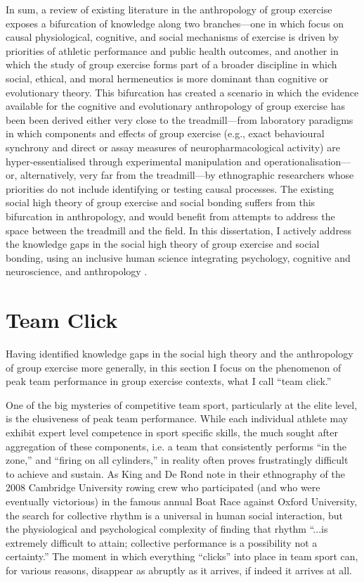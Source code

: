 \begin{CJK}{UTF8}{gbsn}
In sum, a review of existing literature in the anthropology of group exercise exposes a bifurcation of knowledge along two branches---one in which focus on causal physiological, cognitive, and social mechanisms of exercise is driven by priorities of athletic performance and public health outcomes, and another in which the study of group exercise forms part of a broader discipline in which social, ethical, and moral hermeneutics is more dominant than cognitive or evolutionary theory.  This bifurcation has created a scenario in which the evidence available for the cognitive and evolutionary anthropology of group exercise has been been derived either very close to the treadmill---from laboratory paradigms in which components and effects of group exercise (e.g., exact behavioural synchrony and direct or assay measures of neuropharmacological activity) are hyper-essentialised through experimental manipulation and operationalisation---or, alternatively, very far from the treadmill---by ethnographic researchers whose priorities do not include identifying or testing causal processes.  The existing social high theory of group exercise and social bonding suffers from this bifurcation in anthropology, and would benefit from attempts to address the space between the treadmill and the field.  In this dissertation, I actively address the knowledge gaps in the social high theory of group exercise and social bonding, using an inclusive human science integrating psychology, cognitive and neuroscience, and anthropology \citep{Whitehouse2012,Downey2014}.



\section{Team Click}

Having identified knowledge gaps in the social high theory and the anthropology of group exercise more generally, in this section I focus on the phenomenon of peak team performance in group exercise contexts, what I call ``team click.''

One of the big mysteries of competitive team sport, particularly at the elite level, is the elusiveness of peak team performance.  While each individual athlete may exhibit expert level competence in sport specific skills, the much sought after aggregation of these components, i.e. a team that consistently performs ``in the zone,'' and ``firing on all cylinders,'' in reality often proves frustratingly difficult to achieve and sustain.  As King and De Rond \textcite[568]{King2011} note in their ethnography of the 2008 Cambridge University rowing crew who participated (and who were eventually victorious) in the famous annual Boat Race against Oxford University, the search for collective rhythm is a universal in human social interaction, but  the physiological and psychological complexity of finding that rhythm ``...is extremely difficult to attain; collective performance is a possibility not a certainty.''   The moment in which everything ``clicks'' into place in team sport can, for various reasons, disappear as abruptly as it arrives, if indeed it arrives at all.


\end{CJK}
